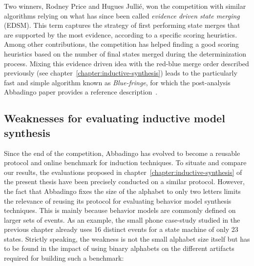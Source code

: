 Two winners, Rodney Price and Hugues Julli\'e, won the competition with similar algorithms relying on what has since been called \emph{evidence driven state merging} (EDSM). This term captures the strategy of first performing state merges that are supported by the most evidence, according to a specific scoring heuristics. Among other contributions, the competition has helped finding a good scoring heuristics based on the number of final states merged during the determinization process. Mixing this evidence driven idea with the red-blue merge order described previously (see chapter~\ref{chapter:inductive-synthesis}) leads to the particularly fast and simple algorithm known as \emph{Blue-fringe}, for which the post-analysis Abbadingo paper provides a reference description~\cite{Lang:1998}.

\subsection{Weaknesses for evaluating inductive model synthesis}

Since the end of the competition, Abbadingo has evolved to become a reusable protocol and online benchmark for induction techniques. To situate and compare our results, the evaluations proposed in chapter~\ref{chapter:inductive-synthesis} of the present thesis have been precisely conducted on a similar protocol. However, the fact that Abbadingo fixes the size of the alphabet to only two letters limits the relevance of reusing its protocol for evaluating behavior model synthesis techniques. This is mainly because behavior models are commonly defined on larger sets of events. As an example, the small phone case-study studied in the previous chapter already uses 16 distinct events for a state machine of only 23 states. Strictly speaking, the weakness is not the small alphabet size itself but has to be found in the impact of using binary alphabets on the different artifacts required for building such a benchmark:

